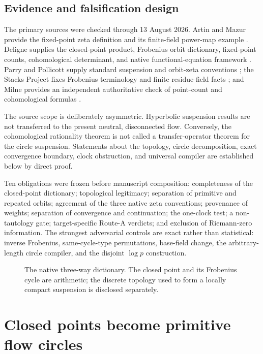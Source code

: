 \documentclass[11pt]{article}
\theoremstyle{definition}
\theoremstyle{remark}
\begin{document}
\subsection{Evidence and falsification design}

The primary sources were checked through 13 August 2026.  Artin and Mazur
provide the fixed-point zeta definition and its finite-field power-map
example \citep{ArtinMazur1965}.  Deligne supplies the closed-point product,
Frobenius orbit dictionary, fixed-point counts, cohomological determinant,
and native functional-equation framework \citep{Deligne1974}.  Parry and
Pollicott supply standard suspension and orbit-zeta conventions
\citep{ParryPollicott1990}; the Stacks Project fixes Frobenius terminology and
finite residue-field facts \citep{Stacks01TF,Stacks03SL}; and Milne provides
an independent authoritative check of point-count and cohomological formulas
\citep{Milne2013}.

The source scope is deliberately asymmetric.  Hyperbolic suspension results
are not transferred to the present neutral, disconnected flow.  Conversely,
the cohomological rationality theorem is not called a transfer-operator
theorem for the circle suspension.  Statements about the topology, circle
decomposition, exact convergence boundary, clock obstruction, and universal
compiler are established below by direct proof.

Ten obligations were frozen before manuscript composition: completeness of
the closed-point dictionary; topological legitimacy; separation of primitive
and repeated orbits; agreement of the three native zeta conventions;
provenance of weights; separation of convergence and continuation; the
one-clock test; a non-tautology gate; target-specific Route-A verdicts; and
exclusion of Riemann-zero information.  The strongest adversarial controls
are exact rather than statistical: inverse Frobenius, same-cycle-type
permutations, base-field change, the arbitrary-length circle compiler, and
the disjoint \(\log p\) construction.

\begin{figure}[t]
  \centering
  
  \caption{The native three-way dictionary.  The closed point and its
  Frobenius cycle are arithmetic; the discrete topology used to form a
  locally compact suspension is disclosed separately.}
  \label{fig:dictionary}
\end{figure}

\section{Closed points become primitive flow circles}
\label{sec:orbits}
\end{document}
